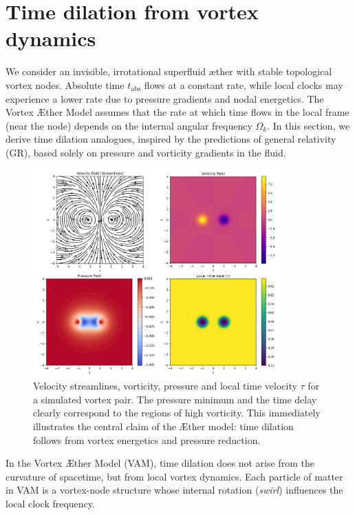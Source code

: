 \section{Time dilation from vortex dynamics}

We consider an invisible, irrotational superfluid æther with stable topological vortex nodes. Absolute time $t_\text{abs}$ flows at a constant rate, while local clocks may experience a lower rate due to pressure gradients and nodal energetics. The Vortex Æther Model assumes that the rate at which time flows in the local frame (near the node) depends on the internal angular frequency $\Omega_k$. In this section, we derive time dilation analogues, inspired by the predictions of general relativity (GR), based solely on pressure and vorticity gradients in the fluid.

\begin{figure}[htbp]
    \centering
    \includegraphics[width=0.85\textwidth]{01-streamlinesDiPole}
    \caption{Velocity streamlines, vorticity, pressure and local time velocity $\tau$ for a simulated vortex pair. The pressure minimum and the time delay clearly correspond to the regions of high vorticity. This immediately illustrates the central claim of the Æther model: time dilation follows from vortex energetics and pressure reduction.}
    \label{fig:vortexfields}
\end{figure}

In the Vortex Æther Model (VAM), time dilation does not arise from the curvature of spacetime, but from local vortex dynamics. Each particle of matter in VAM is a vortex-node structure whose internal rotation (\textit{swirl}) influences the local clock frequency.

